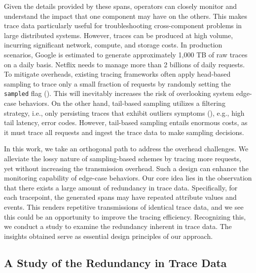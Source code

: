 Given the details provided by these spans, operators can closely monitor and understand the impact that one component may have on the others.
This makes trace data particularly useful for troubleshooting cross-component problems in large distributed systems.
However, traces can be produced at high volume, incurring significant network, compute, and storage costs.
In production scenarios, Google is estimated to generate approximately 1,000 TB of raw traces on a daily basis.
Netflix needs to manage more than 2 billions of daily requests.
To mitigate overheads, existing tracing frameworks often apply head-based sampling to trace only a small fraction of requests by randomly setting the \texttt{sampled} flag ().
This will inevitably increases the risk of overlooking system edge-case behaviors.
On the other hand, tail-based sampling utilizes a filtering strategy, i.e., only persisting traces that exhibit outliers symptoms (), e.g., high tail latency, error codes.
However, tail-based sampling entails enormous costs, as it must trace all requests and ingest the trace data to make sampling decisions.

In this work, we take an orthogonal path to address the overhead challenges.
We alleviate the lossy nature of sampling-based schemes by tracing more requests, yet without increasing the transmission overhead.
Such a design can enhance the monitoring capability of edge-case behaviors.
Our core idea lies in the observation that there exists a large amount of redundancy in trace data.
Specifically, for each tracepoint, the generated spans may have repeated attribute values and events.
This renders repetitive transmissions of identical trace data, and we see this could be an opportunity to improve the tracing efficiency.
Recognizing this, we conduct a study to examine the redundancy inherent in trace data.
The insights obtained serve as essential design principles of our approach.



\subsection{A Study of the Redundancy in Trace Data}
\label{sec:redundancy_study}

